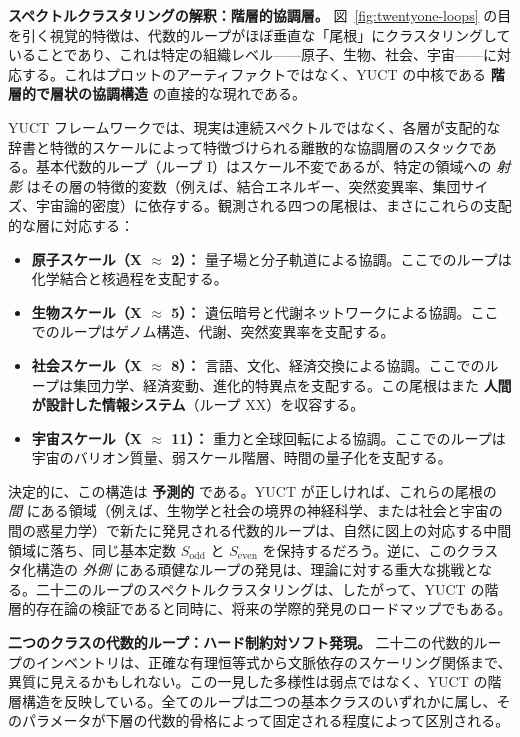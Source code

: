 \documentclass[12pt,a4paper]{article}
\begin{document}
	\vspace{0.5cm}
	\noindent
	\textbf{スペクトルクラスタリングの解釈：階層的協調層。}
	図~\ref{fig:twentyone-loops} の目を引く視覚的特徴は、代数的ループがほぼ垂直な「尾根」にクラスタリングしていることであり、これは特定の組織レベル——原子、生物、社会、宇宙——に対応する。これはプロットのアーティファクトではなく、YUCT の中核である \textbf{階層的で層状の協調構造} の直接的な現れである。
	
	YUCT フレームワークでは、現実は連続スペクトルではなく、各層が支配的な辞書と特徴的スケールによって特徴づけられる離散的な協調層のスタックである。基本代数的ループ（ループ I）はスケール不変であるが、特定の領域への \textit{射影} はその層の特徴的変数（例えば、結合エネルギー、突然変異率、集団サイズ、宇宙論的密度）に依存する。観測される四つの尾根は、まさにこれらの支配的な層に対応する：
	\begin{itemize}
		\item \textbf{原子スケール（X $\approx$ 2）：} 量子場と分子軌道による協調。ここでのループは化学結合と核過程を支配する。
		\item \textbf{生物スケール（X $\approx$ 5）：} 遺伝暗号と代謝ネットワークによる協調。ここでのループはゲノム構造、代謝、突然変異率を支配する。
		\item \textbf{社会スケール（X $\approx$ 8）：} 言語、文化、経済交換による協調。ここでのループは集団力学、経済変動、進化的特異点を支配する。この尾根はまた \textbf{人間が設計した情報システム}（ループ XX）を収容する。
		\item \textbf{宇宙スケール（X $\approx$ 11）：} 重力と全球回転による協調。ここでのループは宇宙のバリオン質量、弱スケール階層、時間の量子化を支配する。
	\end{itemize}
	
	決定的に、この構造は \textbf{予測的} である。YUCT が正しければ、これらの尾根の \textit{間} にある領域（例えば、生物学と社会の境界の神経科学、または社会と宇宙の間の惑星力学）で新たに発見される代数的ループは、自然に図上の対応する中間領域に落ち、同じ基本定数 \(S_{\mathrm{odd}}\) と \(S_{\mathrm{even}}\) を保持するだろう。逆に、このクラスタ化構造の \textit{外側} にある頑健なループの発見は、理論に対する重大な挑戦となる。二十二のループのスペクトルクラスタリングは、したがって、YUCT の階層的存在論の検証であると同時に、将来の学際的発見のロードマップでもある。
	
	\vspace{0.5cm}
	\noindent
	\textbf{二つのクラスの代数的ループ：ハード制約対ソフト発現。}
	二十二の代数的ループのインベントリは、正確な有理恒等式から文脈依存のスケーリング関係まで、異質に見えるかもしれない。この一見した多様性は弱点ではなく、YUCT の階層構造を反映している。全てのループは二つの基本クラスのいずれかに属し、そのパラメータが下層の代数的骨格によって固定される程度によって区別される。
	
\end{document}
